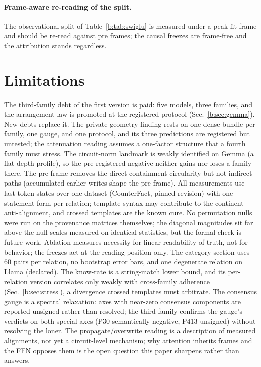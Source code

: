 \documentclass[11pt]{article}
\begin{document}
\paragraph{Frame-aware re-reading of the split.} The observational split
of Table~\ref{b:tab:swiglu} is measured under a peak-fit frame and should be
re-read against pre frames; the causal freezes are frame-free and the
attribution stands regardless.

\section{Limitations}
\label{b:sec:limits}

The third-family debt of the first version is paid: five models, three
families, and the arrangement law is promoted at the registered protocol
(Sec.~\ref{b:sec:gemma}). New debts replace it. The private-geometry
finding rests on one dense bundle per family, one gauge, and one
protocol, and its three predictions are registered but untested; the
attenuation reading assumes a one-factor structure that a fourth family
must stress. The circuit-norm landmark is weakly identified on Gemma (a
flat depth profile), so the pre-registered negative neither gains nor
loses a family there. The pre
frame removes the direct containment circularity but not indirect paths
(accumulated earlier writes shape the pre frame). All measurements use
last-token states over one dataset (CounterFact, pinned revision) with one
statement form per relation; template syntax may contribute to the
continent anti-alignment, and crossed templates are the known cure. No
permutation nulls were run on the provenance matrices themselves; the
diagonal magnitudes sit far above the null scales measured on identical
statistics, but the formal check is future work. Ablation measures
necessity for linear readability of truth, not for behavior; the freezes
act at the reading position only. The category section uses $60$ pairs per
relation, no bootstrap error bars, and one degenerate relation on Llama
(declared). The know-rate is a string-match lower bound, and its per-relation
version correlates only weakly with cross-family adherence
(Sec.~\ref{b:sec:stress}), a divergence crossed templates must
arbitrate. The consensus gauge is a spectral relaxation: axes with
near-zero consensus components are reported unsigned rather than
resolved; the third family confirms the gauge's verdicts on both special
axes (P30 semantically negative, P413 unsigned) without resolving the
loner. The
propagate/overwrite reading is a description of measured alignments, not
yet a circuit-level mechanism; why attention inherits frames and the FFN
opposes them is the open question this paper sharpens rather than answers.
\end{document}
